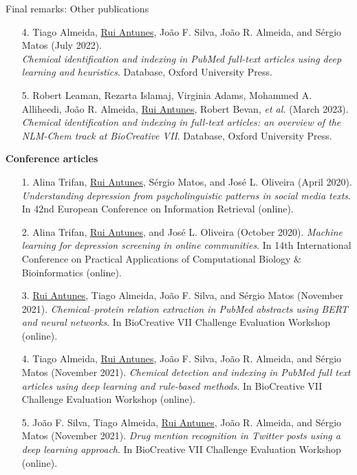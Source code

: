 \begin{frame}[t]{Final remarks: Other publications}
\begin{itemize}
\item[4.]
Tiago Almeida, \underline{Rui Antunes}, João F. Silva, João R. Almeida, and Sérgio Matos (July 2022).\\
\textit{Chemical identification and indexing in PubMed full-text articles using deep learning and heuristics}.
Database, Oxford University Press.

\item[5.]
Robert Leaman, Rezarta Islamaj, Virginia Adams, Mohammed A. Alliheedi, João R. Almeida, \underline{Rui Antunes}, Robert Bevan, \textit{et al.} (March 2023).\\
\textit{Chemical identification and indexing in full-text articles: an overview of the NLM-Chem track at BioCreative VII}.
Database, Oxford University Press.

\end{itemize}

\vspace*{3mm}

\textbf{\minorscriptsize Conference articles}

\begin{itemize}

\item[1.]
Alina Trifan, \underline{Rui Antunes}, Sérgio Matos, and José L. Oliveira (April 2020). %
\textit{Understanding depression from psycholinguistic patterns in social media texts}.
In 42nd European Conference on Information Retrieval (online).

\item[2.]
Alina Trifan, \underline{Rui Antunes}, and José L. Oliveira (October 2020). %
\textit{Machine learning for depression screening in online communities}.
In 14th International Conference on Practical Applications of Computational Biology \& Bioinformatics (online).

\item[3.]
\underline{Rui Antunes}, Tiago Almeida, João F. Silva, and Sérgio Matos (November 2021). %
\textit{Chemical--protein relation extraction in PubMed abstracts using BERT and neural networks}.
In BioCreative VII Challenge Evaluation Workshop (online).

\item[4.]
Tiago Almeida, \underline{Rui Antunes}, João F. Silva, João R. Almeida, and Sérgio Matos (November 2021). %
\textit{Chemical detection and indexing in PubMed full text articles using deep learning and rule-based methods}.
In BioCreative VII Challenge Evaluation Workshop (online).

\item[5.]
João F. Silva, Tiago Almeida, \underline{Rui Antunes}, João R. Almeida, and Sérgio Matos (November 2021). %
\textit{Drug mention recognition in Twitter posts using a deep learning approach}.
In BioCreative VII Challenge Evaluation Workshop (online).

\end{itemize}

\end{frame}
\renewcommand{\CurrentProgressBarIs}{}
